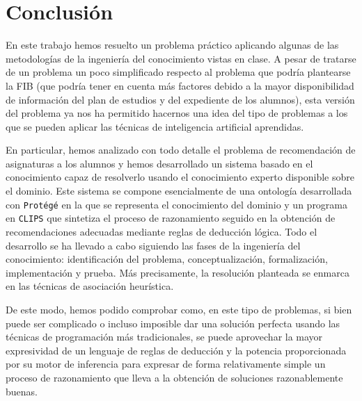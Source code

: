 
\section{Conclusión} \label{sec:conclusion}

En este trabajo hemos resuelto un problema práctico aplicando algunas de las 
metodologías de la ingeniería del conocimiento vistas en clase. A pesar de 
tratarse de un problema un poco simplificado respecto al problema que podría 
plantearse la FIB (que podría tener en cuenta más factores debido a la mayor 
disponibilidad de información del plan de estudios y del expediente de los 
alumnos), esta versión del problema ya nos ha permitido hacernos una idea del 
tipo de problemas a los que se pueden aplicar las técnicas de inteligencia 
artificial aprendidas.

En particular, hemos analizado con todo detalle el problema de recomendación 
de asignaturas a los alumnos y hemos desarrollado un sistema basado en el 
conocimiento capaz de resolverlo usando el conocimiento experto disponible 
sobre el dominio. Este sistema se compone esencialmente de una ontología 
desarrollada con \texttt{Protégé} en la que se representa el conocimiento del 
dominio y un programa en \texttt{CLIPS} que sintetiza el proceso de 
razonamiento seguido en la obtención de recomendaciones adecuadas mediante 
reglas de deducción lógica. Todo el desarrollo se ha llevado a cabo siguiendo 
las fases de la ingeniería del conocimiento: identificación del problema, 
conceptualización, formalización, implementación y prueba. Más precisamente, 
la resolución planteada se enmarca en las técnicas de asociación heurística.

De este modo, hemos podido comprobar como, en este tipo de problemas, si bien 
puede ser complicado o incluso imposible dar una solución perfecta usando las 
técnicas de programación más tradicionales, se puede aprovechar la mayor 
expresividad de un lenguaje de reglas de deducción y la potencia proporcionada 
por su motor de inferencia para expresar de forma relativamente simple un 
proceso de razonamiento que lleva a la obtención de soluciones razonablemente 
buenas.


\clearpage

